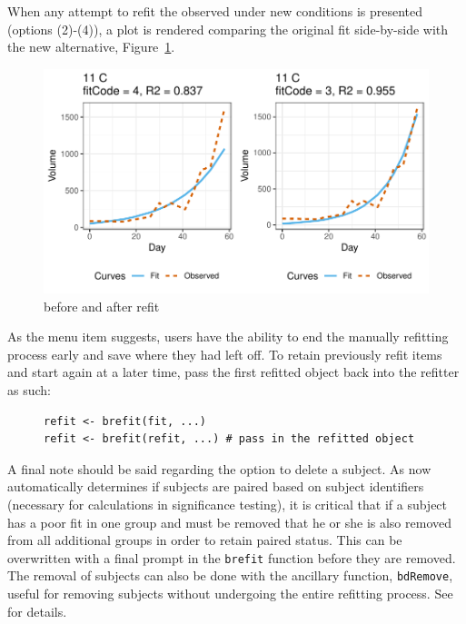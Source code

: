 When any attempt to refit the observed under new conditions is presented (options (2)-(4)), a plot is rendered comparing the original fit side-by-side with the new alternative, Figure~\ref{fig:refit_plot}.

\begin{figure}[H]
\centering
\includegraphics{img/mouse_refit_plot.pdf}
\caption{before and after refit}
\label{fig:refit_plot}
\end{figure}

As the menu item suggests, users have the ability to end the manually refitting process early and save where they had left off. To retain previously refit items and start again at a later time, pass the first refitted object back into the refitter as such:

\begin{singlespace}
\begin{figure}[H]
\centering
\begin{BVerbatim}
refit <- brefit(fit, ...)
refit <- brefit(refit, ...) # pass in the refitted object
\end{BVerbatim}
\end{figure}
\end{singlespace}



A final note should be said regarding the option to delete a subject. As  now automatically determines if subjects are paired based on subject identifiers (necessary for  calculations in significance testing), it is critical that if a subject has a poor fit in one group and must be removed that he or she is also removed from all additional groups in order to retain paired status. This can be overwritten with a final prompt in the \texttt{brefit} function before they are removed. The removal of subjects can also be done with the ancillary function, \texttt{bdRemove}, useful for removing subjects without undergoing the entire refitting process. See  for details.


